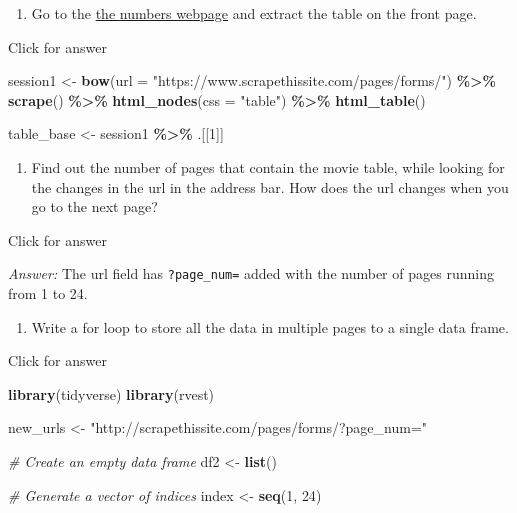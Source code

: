 \documentclass[
]{book}
\newenvironment{Shaded}{\begin{snugshade}}{\end{snugshade}}
\newcommand{\AttributeTok}[1]{\textcolor[rgb]{0.13,0.29,0.53}{#1}}
\newcommand{\CommentTok}[1]{\textcolor[rgb]{0.56,0.35,0.01}{\textit{#1}}}
\newcommand{\DecValTok}[1]{\textcolor[rgb]{0.00,0.00,0.81}{#1}}
\newcommand{\FunctionTok}[1]{\textcolor[rgb]{0.13,0.29,0.53}{\textbf{#1}}}
\newcommand{\NormalTok}[1]{#1}
\newcommand{\OtherTok}[1]{\textcolor[rgb]{0.56,0.35,0.01}{#1}}
\newcommand{\SpecialCharTok}[1]{\textcolor[rgb]{0.81,0.36,0.00}{\textbf{#1}}}
\newcommand{\StringTok}[1]{\textcolor[rgb]{0.31,0.60,0.02}{#1}}
\providecommand{\tightlist}{%
  \setlength{\itemsep}{0pt}\setlength{\parskip}{0pt}}
\begin{document}
\begin{enumerate}
\def\labelenumi{\arabic{enumi}.}
\tightlist
\item
  Go to the \href{https://www.scrapethissite.com/pages/forms/}{the numbers webpage} and extract the table on the front page.
\end{enumerate}

Click for answer

\begin{Shaded}
\begin{Highlighting}[]
\NormalTok{session1 }\OtherTok{\textless{}{-}} \FunctionTok{bow}\NormalTok{(}\AttributeTok{url =} \StringTok{"https://www.scrapethissite.com/pages/forms/"}\NormalTok{) }\SpecialCharTok{\%\textgreater{}\%} \FunctionTok{scrape}\NormalTok{() }\SpecialCharTok{\%\textgreater{}\%}
  \FunctionTok{html\_nodes}\NormalTok{(}\AttributeTok{css =} \StringTok{"table"}\NormalTok{) }\SpecialCharTok{\%\textgreater{}\%}
  \FunctionTok{html\_table}\NormalTok{()}

\NormalTok{table\_base }\OtherTok{\textless{}{-}}\NormalTok{ session1 }\SpecialCharTok{\%\textgreater{}\%}\NormalTok{ .[[}\DecValTok{1}\NormalTok{]]}
\end{Highlighting}
\end{Shaded}

\begin{enumerate}
\def\labelenumi{\arabic{enumi}.}
\setcounter{enumi}{1}
\tightlist
\item
  Find out the number of pages that contain the movie table, while looking for the changes in the url in the address bar. How does the url changes when you go to the next page?
\end{enumerate}

Click for answer

\emph{Answer:} The url field has \texttt{?page\_num=} added with the number of pages running from 1 to 24.

\begin{enumerate}
\def\labelenumi{\arabic{enumi}.}
\setcounter{enumi}{2}
\tightlist
\item
  Write a for loop to store all the data in multiple pages to a single data frame.
\end{enumerate}

Click for answer

\begin{Shaded}
\begin{Highlighting}[]
\FunctionTok{library}\NormalTok{(tidyverse)}
\FunctionTok{library}\NormalTok{(rvest)}

\NormalTok{new\_urls }\OtherTok{\textless{}{-}} \StringTok{"http://scrapethissite.com/pages/forms/?page\_num="}

\CommentTok{\# Create an empty data frame}
\NormalTok{df2 }\OtherTok{\textless{}{-}} \FunctionTok{list}\NormalTok{()}

\CommentTok{\# Generate a vector of indices}
\NormalTok{index }\OtherTok{\textless{}{-}} \FunctionTok{seq}\NormalTok{(}\DecValTok{1}\NormalTok{, }\DecValTok{24}\NormalTok{)}
\end{Highlighting}
\end{Shaded}
\end{document}
